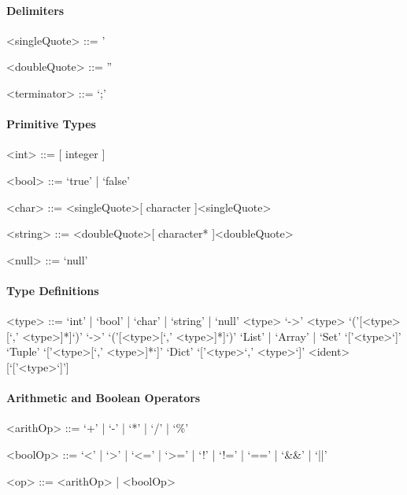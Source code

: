 \documentclass[11pt]{article} %
\begin{document}
\paragraph{Delimiters}

\begin{grammar}

<singleQuote> ::= '

<doubleQuote> ::= ''

<terminator> ::= `;'

\end{grammar}

\paragraph{Primitive Types}

\begin{grammar}

<int> ::= [ integer ]

<bool> ::= `true' | `false'

<char> ::= <singleQuote>[ character ]<singleQuote>

<string> ::= <doubleQuote>[ character* ]<doubleQuote>

<null> ::= `null'

\end{grammar}

\paragraph{Type Definitions}

\begin{grammar}

<type> ::= `int' | `bool' | `char' | `string' | `null'
\alt <type> `->' <type>
\alt `('[<type>[`,' <type>]*]`)' `->' `('[<type>[`,' <type>]*]`)'
\alt `List' | `Array' | `Set' `['<type>`]'
\alt `Tuple' `['<type>[`,' <type>]*`]'
\alt `Dict' `['<type>`,' <type>`]'
\alt <ident>[`['<type>`]']

\end{grammar}

\paragraph{Arithmetic and Boolean Operators}

\begin{grammar}

<arithOp> ::= `+' | `-' | `*' | `/' | `\%'

<boolOp> ::= `<' | `>' | `<=' | `>=' | `!' | `!=' | `==' | `\&\&' | `||'

<op> ::= <arithOp> | <boolOp> 

\end{grammar}
\end{document}
